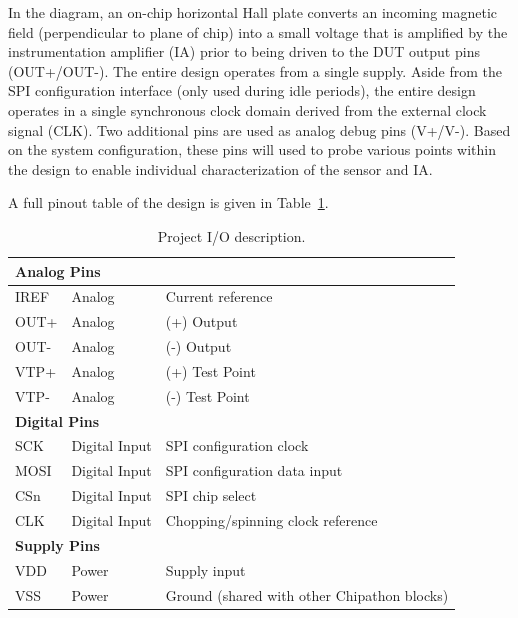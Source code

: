 \documentclass{article}
\begin{document}
In the diagram, an on-chip horizontal Hall plate converts an incoming magnetic
field (perpendicular to plane of chip) into a small voltage that is amplified by the instrumentation amplifier (IA)
prior to being driven to the DUT output pins (OUT+/OUT-). The entire design operates from 
a single supply. Aside from the SPI configuration interface (only used during idle periods), 
the entire design operates in a single synchronous clock domain derived from the external clock signal (CLK).
Two additional pins are used as analog debug pins (V+/V-). Based on the system configuration, these pins will used
to probe various points within the design to enable individual characterization of the sensor and IA.

A full pinout table of the design is given in Table~\ref{tab:pinout}.

\begin{table}[H]
    \centering
    \begin{tabularx}{\linewidth}{l l X}
        \toprule

        \multicolumn{3}{l}{\textbf{Analog Pins}} \\
        \midrule
        IREF   & Analog & Current reference \\
        OUT+   & Analog & (+) Output \\
        OUT-   & Analog & (-) Output \\
        VTP+   & Analog & (+) Test Point \\
        VTP-   & Analog & (-) Test Point \\
        \midrule

        \multicolumn{3}{l}{\textbf{Digital Pins}} \\
        \midrule
        SCK    & Digital Input & SPI configuration clock \\
        MOSI   & Digital Input & SPI configuration data input \\
        CSn    & Digital Input & SPI chip select \\
        CLK    & Digital Input & Chopping/spinning clock reference \\
        \midrule

        \multicolumn{3}{l}{\textbf{Supply Pins}} \\
        \midrule
        VDD    & Power & Supply input \\
        VSS    & Power & Ground (shared with other Chipathon blocks) \\
        \bottomrule
    \end{tabularx}
    \caption{Project I/O description.}
    \label{tab:pinout}
\end{table}
\end{document}
